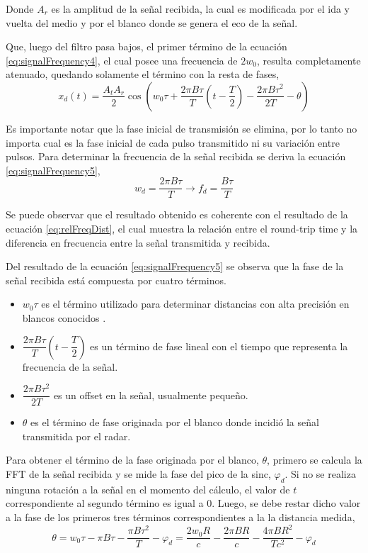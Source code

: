 Donde $A_r$ es la amplitud de la señal recibida, la cual es modificada por el ida y vuelta del medio y por el blanco donde se genera el eco de la señal.

Que, luego del filtro pasa bajos, el primer término de la ecuación \ref{eq:signalFrequency4}, el cual posee una frecuencia de $2w_0$, resulta completamente atenuado, quedando solamente el término con la resta de fases,
\begin{equation}
  x_d(t) = \dfrac{A_tA_r}{2}\cos(w_0\tau + \dfrac{2\pi B\tau}{T}(t - \dfrac{T}{2}) - \dfrac{2\pi B\tau^2}{2T} - \theta)
  \label{eq:signalFrequency5}
\end{equation}

Es importante notar que la fase inicial de transmisión se elimina, por lo tanto no importa cual es la fase inicial de cada pulso
transmitido ni su variación entre pulsos. Para determinar la frecuencia de la señal recibida se deriva la ecuación \ref{eq:signalFrequency5}, 
\begin{equation}\label{eq:beatFreq}
  w_d = \dfrac{2\pi B\tau}{T} \rightarrow f_d = \dfrac{B\tau}{T}
\end{equation}

Se puede observar que el resultado obtenido es coherente con el resultado de la ecuación \ref{eq:relFreqDist}, el cual muestra la relación entre el round-trip time y la diferencia en frecuencia entre la señal transmitida y recibida.

Del resultado de la ecuación \ref{eq:signalFrequency5} se observa que la fase de la señal recibida está compuesta por cuatro términos.
\begin{itemize}
  \item $w_0\tau$ es el término utilizado para determinar distancias con alta precisión en blancos conocidos \cite{Brennan2014a}.
  \item $\dfrac{2\pi B\tau}{T}(t - \dfrac{T}{2})$ es un término de fase lineal con el tiempo que representa la frecuencia de la señal.
  \item $\dfrac{2\pi B\tau^2}{2T}$ es un offset en la señal, usualmente pequeño.
  \item $\theta$ es el término de fase originada por el blanco donde incidió la señal transmitida por el radar.
\end{itemize}

Para obtener el término de la fase originada por el blanco, $\theta$, primero se calcula la FFT de la señal recibida y se mide la fase del pico de la sinc, $\varphi_d$. Si no se realiza ninguna rotación a la señal en el momento del cálculo, el valor de $t$ correspondiente al segundo término es igual a 0. Luego, se debe restar dicho valor a la fase de los primeros tres términos correspondientes a la la distancia medida, 
\begin{equation}\label{eq:phaseMeasurement}
  \theta =  w_0\tau - \pi B\tau - \dfrac{\pi B\tau^2}{T} - \varphi_d  = \dfrac{2w_0R}{c} - \dfrac{2\pi BR}{c} - \dfrac{4\pi BR^2}{Tc^2} - \varphi_d
\end{equation}

